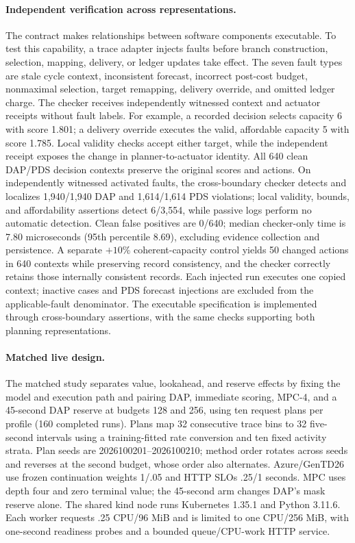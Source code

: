 \documentclass[acmsmall,screen,review,anonymous]{acmart}
\begin{document}
\paragraph{Independent verification across representations.}
The contract makes relationships between software components executable.
To test this capability, a trace adapter injects faults before branch construction,
selection, mapping, delivery, or ledger updates take effect. The seven fault
types are stale cycle context, inconsistent forecast, incorrect post-cost
budget, nonmaximal selection, target remapping, delivery override, and omitted
ledger charge. The checker receives independently witnessed context and
actuator receipts without fault labels. For example, a recorded decision selects capacity
6 with score 1.801; a delivery override executes the valid, affordable capacity
5 with score 1.785. Local validity checks accept either target, while the
independent receipt exposes the change in planner-to-actuator identity.
All 640 clean DAP/PDS decision contexts preserve
the original scores and actions. On independently witnessed activated faults,
the cross-boundary checker detects and localizes 1,940/1,940 DAP and
1,614/1,614 PDS violations; local validity, bounds, and affordability assertions
detect 6/3,554, while passive logs perform no automatic detection. Clean
false positives are 0/640; median checker-only time is 7.80 microseconds
(95th percentile 8.69), excluding evidence collection and persistence.
A separate $+10\%$ coherent-capacity control yields 50 changed actions
in 640 contexts while preserving record consistency, and the checker
correctly retains those internally consistent records. Each injected run
executes one copied context; inactive cases and PDS forecast injections are
excluded from the applicable-fault denominator.
The executable specification is implemented through cross-boundary assertions,
with the same checks supporting both planning representations.

\paragraph{Matched live design.}
The matched study separates value, lookahead, and reserve effects by fixing the model and execution path and
pairing DAP, immediate scoring, MPC-4, and a 45-second DAP reserve at budgets
128 and 256, using ten request plans per profile (160 completed runs).
Plans map 32 consecutive trace bins to 32 five-second intervals using a
training-fitted rate conversion and ten fixed activity strata. Plan seeds are
2026100201--2026100210; method order rotates across seeds and reverses at the
second budget, whose order also alternates. Azure/GenTD26 use frozen
continuation weights 1/.05 and HTTP SLOs .25/1 seconds. MPC uses depth four
and zero terminal value; the 45-second arm changes DAP's mask reserve alone.
The shared kind node runs Kubernetes 1.35.1 and Python 3.11.6. Each worker
requests .25 CPU/96 MiB and is limited to one CPU/256 MiB, with one-second
readiness probes and a bounded queue/CPU-work HTTP service.
\end{document}

